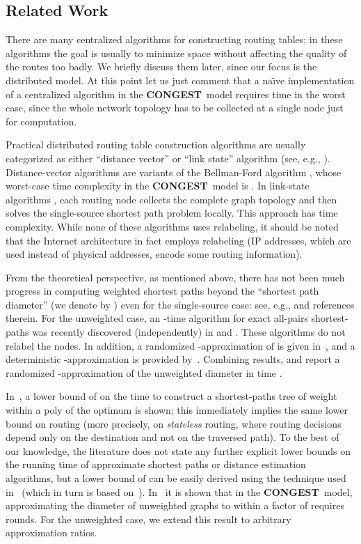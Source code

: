 \documentclass[letterpaper,11pt]{article}
\newcommand{\CONGEST}{\textbf{CONGEST}}
\begin{document}
\subsection{Related Work}






There are many centralized algorithms for constructing routing tables; in these
algorithms the goal is usually to minimize space without affecting the quality
of the routes too badly. We briefly discuss them later, since our focus is the
distributed model. At this point let us just comment that a na\"\i ve
implementation of a centralized algorithm in the \CONGEST\ model requires
 time in the worst case, since the whole network topology has to be
collected at a single node just for computation.

Practical distributed routing table construction algorithms are usually
categorized as either ``distance vector'' or ``link state'' algorithm (see,
e.g., \cite{PetersonD:book}). Distance-vector algorithms are variants of the
Bellman-Ford algorithm \cite{Bellman,Ford-56}, whose worst-case time complexity
in the \CONGEST\ model is . In link-state algorithms
\cite{MQRR80,OSPF}, each routing node collects the complete graph topology and
then solves the single-source shortest path problem locally. This approach has
 time complexity. While none of these algorithms uses relabeling,
it should be noted that the Internet architecture in fact employs relabeling (IP
addresses, which are used instead of physical addresses,  encode some routing
information).

From the theoretical perspective, as mentioned above, there has not been much
progress in computing weighted shortest paths beyond the ``shortest path
diameter'' (we denote by ) even for the single-source case: see, e.g.,
\cite{DDP} and references therein. For the unweighted case, an -time
algorithm for exact all-pairs shortest-paths was recently discovered
(independently) in \cite{HW12} and \cite{PLT-12}. These algorithms do not
relabel the nodes. In addition, a randomized -approximation of  is
given in~\cite{PLT-12}, and a deterministic -approximation is
provided by~\cite{HW12}. Combining results, \cite{HW12} and \cite{PLT-12} report
a randomized -approximation of the unweighted diameter in time
.

In~\cite{DHKNPPW-11}, a lower bound of  on the
time to construct a shortest-paths tree of weight within a poly
of the optimum is shown; this immediately implies the same
lower bound on routing (more precisely, on \emph{stateless} routing,
where routing decisions depend only on the destination and not on the
traversed path). To the best of our knowledge, 
the literature does not state any further explicit lower bounds on the running
time of approximate shortest paths or distance estimation
algorithms, but  a lower bound of
 can be easily derived using the 
technique used in~\cite{DHKNPPW-11} (which in turn is based
on~\cite{PelegR-00}). 
In~\cite{FHW-12} it is shown that in the \CONGEST\ model,
approximating the diameter of unweighted graphs
to within a factor of  requires
 rounds. For the unweighted case, we extend this result
to arbitrary approximation ratios.
\end{document}
